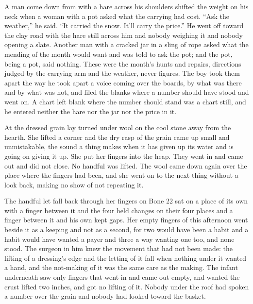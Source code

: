 A man come down from  with a hare across his shoulders shifted the weight on his neck when a woman with a pot asked what the carrying had cost. “Ask the weather,” he said. “It carried the snow. It'll carry the price.” He went off toward the clay road with the hare still across him and nobody weighing it and nobody opening a slate. Another man with a cracked jar in a sling of rope asked what the mending of the month would want and was told to ask the pot; and the pot, being a pot, said nothing. These were the month's hunts and repairs, directions judged by the carrying arm and the weather, never figures. The boy took them apart the way he took apart a voice coming over the boards, by what was there and by what was not, and filed the blanks where a number should have stood and went on. A chart left blank where the number should stand was a chart still, and he entered neither the hare nor the jar nor the price in it.

\scenebreak

At  the dressed grain lay turned under wool on the cool stone away from the hearth. She lifted a corner and the dry rasp of the grain came up small and unmistakable, the sound a thing makes when it has given up its water and is going on giving it up. She put her fingers into the heap. They went in and came out and did not close. No handful was lifted. The wool came down again over the place where the fingers had been, and she went on to the next thing without a look back, making no show of not repeating it.

The handful let fall back through her fingers on Bone 22 sat on a place of its own with a finger between it and the four held changes on their four places and a finger between it and his own kept gaps. Her empty fingers of this afternoon went beside it as a keeping and not as a second, for two would have been a habit and a habit would have wanted a payer and three a way wanting one too, and none stood. The surgeon in him knew the movement that had not been made: the lifting of a dressing's edge and the letting of it fall when nothing under it wanted a hand, and the not-making of it was the same care as the making. The infant underneath saw only fingers that went in and came out empty, and wanted the crust lifted two inches, and got no lifting of it. Nobody under the roof had spoken a number over the grain and nobody had looked toward the basket.

